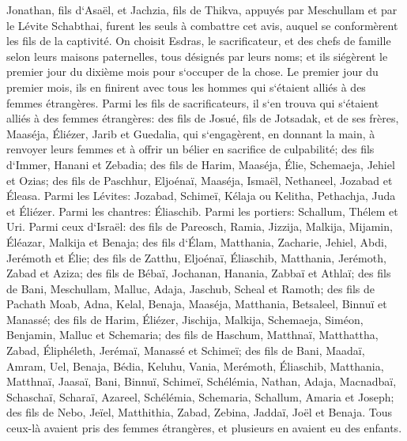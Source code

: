 \verse Jonathan, fils d`Asaël, et Jachzia, fils de Thikva, appuyés par Meschullam et par le Lévite Schabthai, furent les seuls à combattre cet avis, 
\verse auquel se conformèrent les fils de la captivité. On choisit Esdras, le sacrificateur, et des chefs de famille selon leurs maisons paternelles, tous désignés par leurs noms; et ils siégèrent le premier jour du dixième mois pour s`occuper de la chose. 
\verse Le premier jour du premier mois, ils en finirent avec tous les hommes qui s`étaient alliés à des femmes étrangères. 
\verse Parmi les fils de sacrificateurs, il s`en trouva qui s`étaient alliés à des femmes étrangères: des fils de Josué, fils de Jotsadak, et de ses frères, Maaséja, Éliézer, Jarib et Guedalia, 
\verse qui s`engagèrent, en donnant la main, à renvoyer leurs femmes et à offrir un bélier en sacrifice de culpabilité; 
\verse des fils d`Immer, Hanani et Zebadia; 
\verse des fils de Harim, Maaséja, Élie, Schemaeja, Jehiel et Ozias; 
\verse des fils de Paschhur, Eljoénaï, Maaséja, Ismaël, Nethaneel, Jozabad et Éleasa. 
\verse Parmi les Lévites: Jozabad, Schimeï, Kélaja ou Kelitha, Pethachja, Juda et Éliézer. 
\verse Parmi les chantres: Éliaschib. Parmi les portiers: Schallum, Thélem et Uri. 
\verse Parmi ceux d`Israël: des fils de Pareosch, Ramia, Jizzija, Malkija, Mijamin, Éléazar, Malkija et Benaja; 
\verse des fils d`Élam, Matthania, Zacharie, Jehiel, Abdi, Jerémoth et Élie; 
\verse des fils de Zatthu, Eljoénaï, Éliaschib, Matthania, Jerémoth, Zabad et Aziza; 
\verse des fils de Bébaï, Jochanan, Hanania, Zabbaï et Athlaï; 
\verse des fils de Bani, Meschullam, Malluc, Adaja, Jaschub, Scheal et Ramoth; 
\verse des fils de Pachath Moab, Adna, Kelal, Benaja, Maaséja, Matthania, Betsaleel, Binnuï et Manassé; 
\verse des fils de Harim, Éliézer, Jischija, Malkija, Schemaeja, Siméon, 
\verse Benjamin, Malluc et Schemaria; 
\verse des fils de Haschum, Matthnaï, Matthattha, Zabad, Éliphéleth, Jerémaï, Manassé et Schimeï; 
\verse des fils de Bani, Maadaï, Amram, Uel, 
\verse Benaja, Bédia, Keluhu, 
\verse Vania, Merémoth, Éliaschib, 
\verse Matthania, Matthnaï, Jaasaï, 
\verse Bani, Binnuï, Schimeï, 
\verse Schélémia, Nathan, Adaja, 
\verse Macnadbaï, Schaschaï, Scharaï, 
\verse Azareel, Schélémia, Schemaria, 
\verse Schallum, Amaria et Joseph; 
\verse des fils de Nebo, Jeïel, Matthithia, Zabad, Zebina, Jaddaï, Joël et Benaja. 
\verse Tous ceux-là avaient pris des femmes étrangères, et plusieurs en avaient eu des enfants. 
